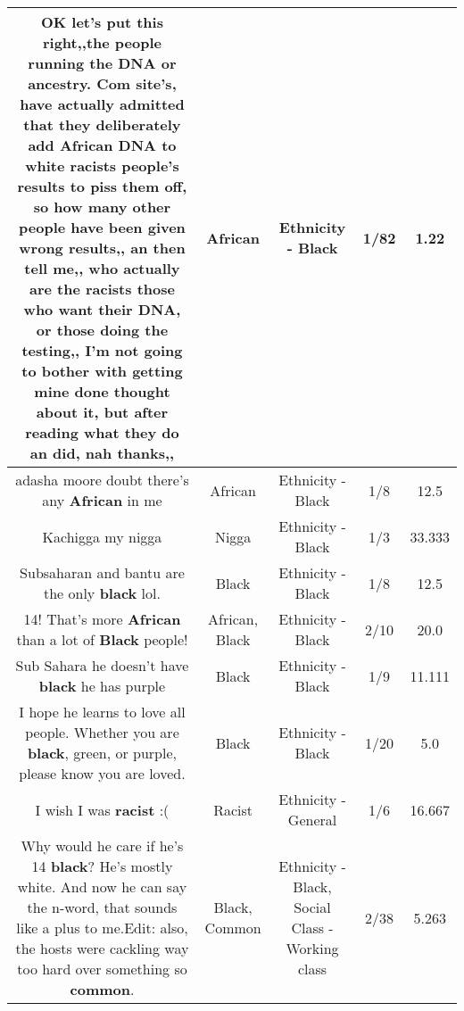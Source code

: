 \documentclass[11pt]{article}
\newlength\mylength
\begin{document}
\begin{center}
\begin{longtable}{|C{.65\mylength}|C{.30\mylength}|C{.12\mylength}|C{.12\mylength}|C{.12\mylength}|}
  \small OK let's put this right,,the people running the DNA or ancestry. Com site's, have actually admitted that they deliberately add \textbf{African} DNA to white racists people's results to piss them off, so how many other people have been given wrong results,, an then tell me,, who actually are the racists those who want their DNA, or those doing the testing,, I'm not going to bother with getting mine done thought about it, but after reading what they do an did, nah thanks,,\normalsize   & African & Ethnicity - Black & 1/82 & 1.22 \\  \hline
  \small adasha moore doubt there's any \textbf{African} in me\normalsize   & African & Ethnicity - Black & 1/8 & 12.5 \\  \hline
  \small Kachigga my nigga\normalsize   & Nigga & Ethnicity - Black & 1/3 & 33.333 \\  \hline
  \small Subsaharan and bantu are the only \textbf{black} lol.\normalsize   & Black & Ethnicity - Black & 1/8 & 12.5 \\  \hline
  \small 14! That's more \textbf{African} than a lot of \textbf{Black} people!\normalsize   & African, Black & Ethnicity - Black & 2/10 & 20.0 \\  \hline
  \small Sub Sahara he doesn't have \textbf{black} he has purple\normalsize   & Black & Ethnicity - Black & 1/9 & 11.111 \\  \hline
  \small I hope he learns to love all people. Whether you are \textbf{black}, green, or purple, please know you are loved.\normalsize   & Black & Ethnicity - Black & 1/20 & 5.0 \\  \hline
  \small I wish I was \textbf{racist} :(\normalsize   & Racist & Ethnicity - General & 1/6 & 16.667 \\  \hline
  \small Why would he care if he's 14 \textbf{black}? He's mostly white. And now he can say the n-word, that sounds like a plus to me.Edit: also, the hosts were cackling way too hard over something so \textbf{common}.\normalsize   & Black, Common & Ethnicity - Black, Social Class - Working class & 2/38 & 5.263 \\  \hline

\end{longtable}
\end{center}
\end{document}
